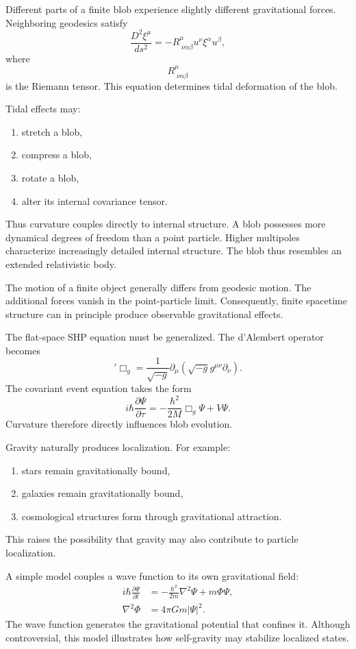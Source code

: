 Different parts of a finite blob experience slightly different
gravitational forces.
Neighboring geodesics satisfy
\[
\frac{D^2\xi^\mu}{ds^2}=-R^\mu_{\;\nu\alpha\beta}
u^\nu \xi^\alpha u^\beta,
\]
where
\[
R^\mu_{\;\nu\alpha\beta}
\]
is the Riemann tensor.
This equation determines tidal deformation of the blob.

Tidal effects may:
\begin{enumerate}
\item stretch a blob,
\item compress a blob,
\item rotate a blob,
\item alter its internal covariance tensor.
\end{enumerate}
Thus curvature couples directly to internal structure.
A blob possesses more dynamical degrees of freedom than a point
particle.
Higher multipoles characterize increasingly detailed internal structure.
The blob thus resembles an extended relativistic body.

The motion of a finite object generally differs from geodesic motion.
The additional forces vanish in the point-particle limit.
Consequently, finite spacetime structure can in principle produce
observable gravitational effects.

The flat-space SHP equation
must be generalized.
The d'Alembert operator becomes
\begin{equation}
    '\label{blb-curv1}
\Box_g=\frac{1}{\sqrt{-g}}\partial_\mu
\left(\sqrt{-g}g^{\mu\nu}\partial_\nu\right).
\end{equation}
The covariant event equation takes the form
\begin{equation}
    \label{blb-curve2}
i\hbar \frac{\partial\Psi}{\partial\tau}=
-\frac{\hbar^2}{2M}\Box_g\Psi+V\Psi.
\end{equation}
Curvature therefore directly influences blob evolution.

Gravity naturally produces localization.
For example:
\begin{enumerate}
\item stars remain gravitationally bound,
\item galaxies remain gravitationally bound,
\item cosmological structures form through gravitational attraction.
\end{enumerate}
This raises the possibility that gravity may also contribute to particle
localization.

A simple model couples a wave function to its own gravitational field:
\begin{align}
i\hbar \frac{\partial\Psi}{\partial t}&=
-\frac{\hbar^2}{2m}\nabla^2\Psi+m\Phi\Psi,\\
\nabla^2\Phi&=4\pi Gm|\Psi|^2.
\end{align}
The wave function generates the gravitational potential that confines it.
Although controversial, this model illustrates how self-gravity may
stabilize localized states.

